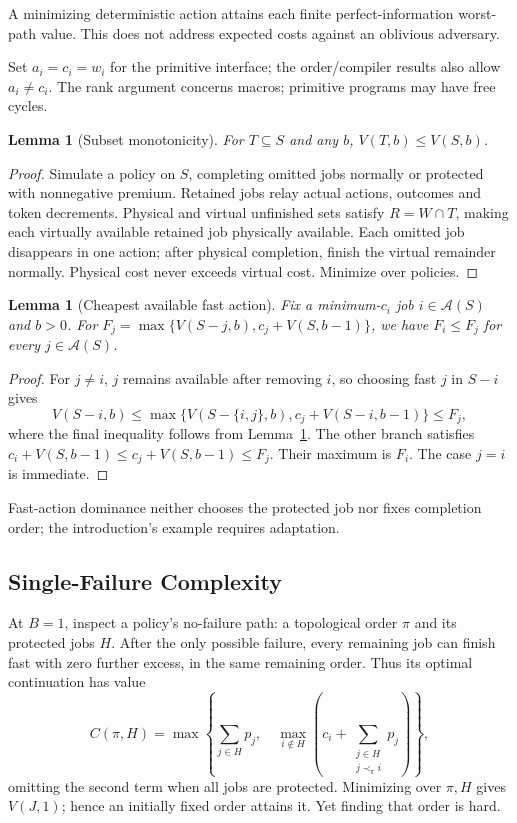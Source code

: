 \documentclass[acmsmall,screen,review,anonymous]{acmart}
\newtheorem{lemma}[theorem]{Lemma}
\begin{document}
A minimizing deterministic action attains each finite perfect-information worst-path value. This does not address expected costs against an oblivious adversary.


Set $a_i=c_i=w_i$ for the primitive interface; the order/compiler results also allow $a_i\ne c_i$. The rank argument concerns macros; primitive programs may have free cycles.

\begin{lemma}[Subset monotonicity]
\label{lem:subset}
For $T\subseteq S$ and any $b$, $V(T,b)\le V(S,b)$.
\end{lemma}
\begin{proof}
Simulate a policy on $S$, completing omitted jobs normally or protected with nonnegative premium. Retained jobs relay actual actions, outcomes and token decrements. Physical and virtual unfinished sets satisfy $R=W\cap T$, making each virtually available retained job physically available. Each omitted job disappears in one action; after physical completion, finish the virtual remainder normally. Physical cost never exceeds virtual cost. Minimize over policies.
\end{proof}

\begin{lemma}[Cheapest available fast action]
\label{lem:priority}
Fix a minimum-$c_i$ job $i\in\mathcal A(S)$ and $b>0$. For $F_j=\max\{V(S-j,b),c_j+V(S,b-1)\}$, we have $F_i\le F_j$ for every $j\in\mathcal A(S)$.
\end{lemma}
\begin{proof}
For $j\ne i$, $j$ remains available after removing $i$, so choosing fast $j$ in $S-i$ gives
\[
 V(S-i,b)\le\max\{V(S-\{i,j\},b),c_j+V(S-i,b-1)\}\le F_j,
\]
where the final inequality follows from Lemma~\ref{lem:subset}. The other branch satisfies $c_i+V(S,b-1)\le c_j+V(S,b-1)\le F_j$. Their maximum is $F_i$. The case $j=i$ is immediate.
\end{proof}


Fast-action dominance neither chooses the protected job nor fixes completion order; the introduction's example requires adaptation.

\subsection{Single-Failure Complexity}

At $B=1$, inspect a policy's no-failure path: a topological order $\pi$ and its protected jobs $H$. After the only possible failure, every remaining job can finish fast with zero further excess, in the same remaining order. Thus its optimal continuation has value
\begin{equation}
 C(\pi,H)=\max\left\{\sum_{j\in H}p_j,\quad
 \max_{i\notin H}\left(c_i+\sum_{\substack{j\in H\\j\prec_\pi i}}p_j\right)\right\},
 \label{eq:onefailure}
\end{equation}
omitting the second term when all jobs are protected. Minimizing over $\pi,H$ gives $V(J,1)$; hence an initially fixed order attains it. Yet finding that order is hard.
\end{document}
